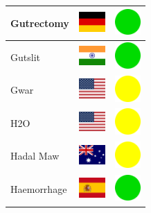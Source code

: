 \documentclass[12pt, a4paper, twoside]{report}
\begin{document}
\begin{center}
\begin{longtable}{|p{5cm}|p{2cm}|p{2cm}|}
Gutrectomy & \includegraphics[width=1cm]{4x3/de} & \includegraphics[width=1cm]{likes/y} \\ \hline
Gutslit & \includegraphics[width=1cm]{4x3/in} & \includegraphics[width=1cm]{likes/y} \\ \hline
Gwar & \includegraphics[width=1cm]{4x3/us} & \includegraphics[width=1cm]{likes/m} \\ \hline
H2O & \includegraphics[width=1cm]{4x3/us} & \includegraphics[width=1cm]{likes/m} \\ \hline
Hadal Maw & \includegraphics[width=1cm]{4x3/au} & \includegraphics[width=1cm]{likes/m} \\ \hline
Haemorrhage & \includegraphics[width=1cm]{4x3/es} & \includegraphics[width=1cm]{likes/y} \\ \hline

\end{longtable}
\end{center}
\end{document}
